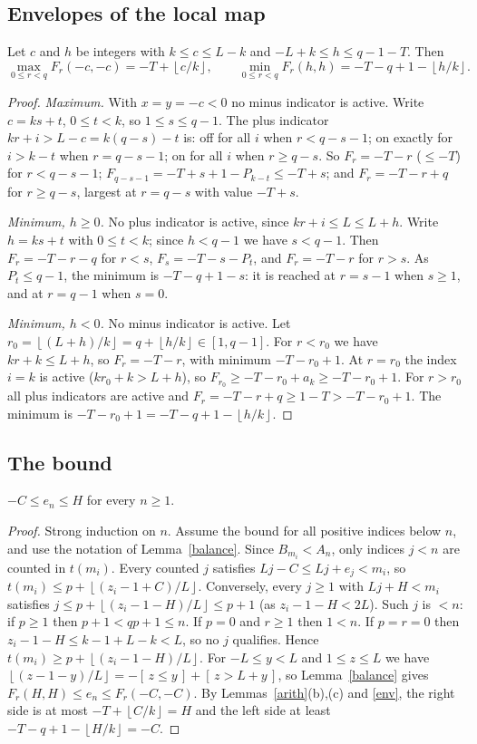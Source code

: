 \documentclass[11pt]{article}
\theoremstyle{remark}\newtheorem{remark}[theorem]{Remark}
\theoremstyle{definition}\newtheorem{definition}[theorem]{Definition}
\newcommand{\fl}[1]{\left\lfloor #1\right\rfloor}
\newcommand{\ind}[1]{[\,#1\,]}
\begin{document}
\subsection{Envelopes of the local map}
\begin{lemma}\label{env}
Let \(c\) and \(h\) be integers with \(k\le c\le L-k\) and \(-L+k\le h\le q-1-T\). Then
\[
\max_{0\le r<q}F_r(-c,-c)=-T+\fl{c/k},\qquad \min_{0\le r<q}F_r(h,h)=-T-q+1-\fl{h/k}.
\]
\end{lemma}
\begin{proof}
\emph{Maximum.} With \(x=y=-c<0\) no minus indicator is active. Write \(c=ks+t\), \(0\le t<k\), so \(1\le s\le q-1\). The plus indicator \(kr+i>L-c=k(q-s)-t\) is: off for all \(i\) when \(r<q-s-1\); on exactly for \(i>k-t\) when \(r=q-s-1\); on for all \(i\) when \(r\ge q-s\). So \(F_r=-T-r\) (\(\le -T\)) for \(r<q-s-1\); \(F_{q-s-1}=-T+s+1-P_{k-t}\le -T+s\); and \(F_r=-T-r+q\) for \(r\ge q-s\), largest at \(r=q-s\) with value \(-T+s\).

\emph{Minimum, \(h\ge0\).} No plus indicator is active, since \(kr+i\le L\le L+h\). Write \(h=ks+t\) with \(0\le t<k\); since \(h<q-1\) we have \(s<q-1\). Then \(F_r=-T-r-q\) for \(r<s\), \(F_s=-T-s-P_t\), and \(F_r=-T-r\) for \(r>s\). As \(P_t\le q-1\), the minimum is \(-T-q+1-s\): it is reached at \(r=s-1\) when \(s\ge1\), and at \(r=q-1\) when \(s=0\).

\emph{Minimum, \(h<0\).} No minus indicator is active. Let \(r_0=\fl{(L+h)/k}=q+\fl{h/k}\in[1,q-1]\). For \(r<r_0\) we have \(kr+k\le L+h\), so \(F_r=-T-r\), with minimum \(-T-r_0+1\). At \(r=r_0\) the index \(i=k\) is active (\(kr_0+k>L+h\)), so \(F_{r_0}\ge -T-r_0+a_k\ge -T-r_0+1\). For \(r>r_0\) all plus indicators are active and \(F_r=-T-r+q\ge1-T>-T-r_0+1\). The minimum is \(-T-r_0+1=-T-q+1-\fl{h/k}\).
\end{proof}

\subsection{The bound}
\begin{proposition}\label{box}
\(-C\le e_n\le H\) for every \(n\ge1\).
\end{proposition}
\begin{proof}
Strong induction on \(n\). Assume the bound for all positive indices below \(n\), and use the notation of Lemma~\ref{balance}. Since \(B_{m_i}<A_n\), only indices \(j<n\) are counted in \(t(m_i)\). Every counted \(j\) satisfies \(Lj-C\le Lj+e_j<m_i\), so
\(t(m_i)\le p+\fl{(z_i-1+C)/L}\).
Conversely, every \(j\ge1\) with \(Lj+H<m_i\) satisfies \(j\le p+\fl{(z_i-1-H)/L}\le p+1\) (as \(z_i-1-H<2L\)). Such \(j\) is \(<n\): if \(p\ge1\) then \(p+1<qp+1\le n\). If \(p=0\) and \(r\ge1\) then \(1<n\). If \(p=r=0\) then \(z_i-1-H\le k-1+L-k<L\), so no \(j\) qualifies. Hence \(t(m_i)\ge p+\fl{(z_i-1-H)/L}\). For \(-L\le y<L\) and \(1\le z\le L\) we have \(\fl{(z-1-y)/L}=-\ind{z\le y}+\ind{z>L+y}\), so Lemma~\ref{balance} gives
\(F_r(H,H)\le e_n\le F_r(-C,-C)\).
By Lemmas~\ref{arith}(b),(c) and \ref{env}, the right side is at most \(-T+\fl{C/k}=H\) and the left side at least \(-T-q+1-\fl{H/k}=-C\).
\end{proof}
\end{document}
